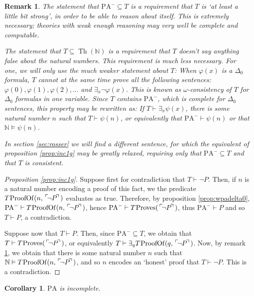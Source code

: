 \documentclass{article}
\newtheorem{corollary}[theorem]{Corollary}
\newtheorem{remark}[theorem]{Remark}
\theoremstyle{nonumberplain}
\newtheorem{proof}{Proof}
\newcommand{\N}{\mathbb{N}}
\newcommand{\PA}{\mathrm{PA}}
\newcommand{\WPA}{\PA^-}
\DeclareMathOperator{\Proves}{\mspace{-2mu}Proves}
\DeclareMathOperator{\ProofOf}{\mspace{-2mu}ProofOf}
\DeclareMathOperator{\Th}{Th}
\newcommand{\gn}[1]{\setbox0=\hbox{$\mathclap{\phantom{t}}#1$} \dimen0=\ht0 \advance\dimen0 by -1.25ex \,\raise\dimen0\hbox{$\ulcorner$} \! \box0 \! \raise\dimen0\hbox{$\urcorner$}\,}
\begin{document}
\begin{remark}\label{rmk:omega}
The statement that $\WPA \subseteq T$ is a requirement that $T$ is `at least a little bit strong', in order to be able to reason about itself. This is extremely necessary; theories with weak enough reasoning may very well be complete and computable.

The statement that $T \subseteq \Th(\N)$ is a requirement that $T$ doesn't say anything false about the natural numbers. This requirement is much less necessary. For one, we will only use the much weaker statement about $T$: When $\varphi(x)$ is a $\Delta_0$ formula, $T$ cannot at the same time prove all the following sentences: $\varphi(0), \varphi(1), \varphi(2), \dots$ and $\exists_x \neg\varphi(x)$. This is known as $\omega$-consistency of $T$ for $\Delta_0$ formulas in one variable. Since $T$ contains $\WPA$, which is complete for $\Delta_0$ sentences, this property may be rewritten as: If $T \vdash \exists_x \psi(x)$, there is some natural number $n$ such that $T \vdash \psi(n)$, or equivalently that $\WPA \vdash \psi(n)$ or that $\N \vDash \psi(n)$.

In section \ref{sec:rosser} we will find a different sentence, for which the equivalent of proposition \ref{prop:inc1g} may be greatly relaxed, requiring only that $\WPA \subseteq T$ and that $T$ is consistent.
\end{remark}

\begin{proof}[Proposition \ref{prop:inc1g}]
Suppose first for contradiction that $T \vdash \neg P$. Then, if $n$ is a natural number encoding a proof of this fact, we the predicate $T\ProofOf(n,\gn{\neg P})$ evaluates as true. Therefore, by proposition \ref{prop:wpadelta0}, $\WPA \vdash T\ProofOf(n,\gn{\neg P})$, hence $\WPA \vdash T\Proves(\gn{\neg P})$, thus $\WPA \vdash P$ and so $T \vdash P$, a contradiction.

Suppose now that $T \vdash P$. Then, since $\WPA \subseteq T$, we obtain that $T \vdash T\Proves(\gn{\neg P})$, or equivalently $T \vdash \exists_q T\ProofOf(q, \gn{\neg P})$. Now, by remark \ref{rmk:omega}, we obtain that there is some natural number $n$ such that $\N \vDash T\ProofOf(n,\gn{\neg P})$, and so $n$ encodes an `honest' proof that $T \vdash \neg P$. This is a contradiction.
\end{proof}

\begin{corollary}
$\PA$ is incomplete.
\end{corollary}
\end{document}
